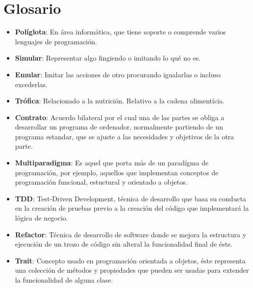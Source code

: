 \newpage
\section*{Glosario}
\begin{itemize}  
  \item \textbf{Políglota}: En área informática, que tiene soporte o comprende varios lenguajes de programación.  
  \item \textbf{Simular}: Representar algo fingiendo o imitando lo qué no es.
  \item \textbf{Emular}: Imitar las acciones de otro procurando igualarlas o incluso excederlas.
  \item \textbf{Trófica}: Relacionado a la nutrición. Relativo a la cadena alimentícia.
  \item \textbf{Contrato}: Acuerdo bilateral por el cual una de las partes se obliga a desarrollar un programa de ordenador, normalmente partiendo de un programa estandar, que se ajuste a las necesidades y objetivos de la otra parte.
  \item{\textbf{Multiparadigma}: Es aquel que porta más de un paradígma de programación, por ejemplo, aquellos que implementan conceptos de programación funcional, estuctural y orientado a objetos.}
  \item{\textbf{TDD}: Test-Driven Development, técnica de desarrollo que basa su conducta en la creación de pruebas previo a la creación del código que implementará la lógica de negocio.}
  \item{\textbf{Refactor}: Técnica de desarrollo de software donde se mejora la estructura y ejecución de un trozo de código sin alteral la funcionalidad final de éste.}
  \item{\textbf{Trait}: Concepto usado en programación orientada a objetos, éste representa una colección de métodos y propiedades que pueden ser usadas para extender la funcionalidad de alguna clase.}
\end{itemize}
